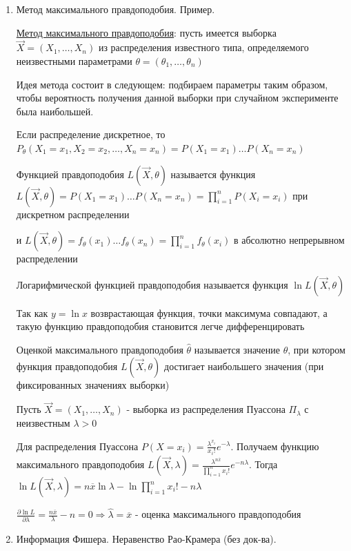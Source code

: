 \begin{enumerate}
    \item Метод максимального правдоподобия. Пример.

    \hyperlink{maximum_likelihood_estimation}{Метод максимального правдоподобия}: пусть имеется выборка $\vec{X} = (X_1, \dots, X_n)$ из распределения известного типа, определяемого неизвестными параметрами 
    $\theta = (\theta_1, \dots, \theta_n)$

    Идея метода состоит в следующем: подбираем параметры таким образом, чтобы вероятность получения
    данной выборки при случайном эксперименте была наибольшей.

    Если распределение дискретное, то $P_{\theta} (X_1 = x_1, X_2 = x_2, \dots, X_n = x_n) = P(X_1 = x_1) \dots P(X_n = x_n)$

    \Defs Функцией правдоподобия $L(\vec{X}, \theta)$ называется функция $L(\vec{X}, \theta) = P(X_1 = x_1) \dots P(X_n = x_n) = \prod_{i = 1}^n P(X_i = x_i)$ при дискретном распределении

    и $L(\vec{X}, \theta) = f_\theta(x_1) \dots f_\theta(x_n) = \prod_{i = 1}^n f_\theta(x_i)$ в абсолютно непрерывном распределении

    \Defs Логарифмической функцией правдоподобия называется функция $\ln L(\vec{X}, \theta)$

    \Notas Так как $y = \ln x$ возврастающая функция, точки максимума совпадают, а такую функцию правдоподобия становится легче дифференцировать

    \Defs Оценкой максимального правдоподобия $\hat{\theta}$ называется значение $\theta$, при котором функция правдоподобия 
    $L(\vec{X}, \theta)$ достигает наибольшего значения (при фиксированных значениях выборки)

    \Ex Пусть $\vec{X} = (X_1, \dots, X_n)$ - выборка из распределения Пуассона $\Pi_\lambda$ с неизвестным $\lambda > 0$

    Для распределения Пуассона $P(X = x_i) = \frac{\lambda^{x_i}}{x_i!} e^{-\lambda}$. Получаем функцию максимального правдоподобия $L(\vec{X}, \lambda) = \frac{\lambda^{n \overline{x}}}{\prod_{i = 1}^n x_i!} e^{-n\lambda}$. Тогда $\ln L(\vec{X}, \lambda) = n \overline{x} \ln \lambda - \ln \prod_{i = 1}^n x_i! - n\lambda$
    
    $\frac{\partial \ln L}{\partial \lambda} = \frac{n \overline{x}}{\lambda} - n = 0 \Longrightarrow \hat{\lambda} = \overline{x}$ - оценка максимального правдоподобия
    
    \item Информация Фишера. Неравенство Рао-Крамера (без док-ва).


\end{enumerate}
